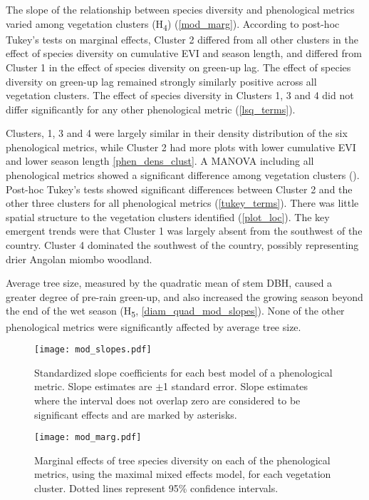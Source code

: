 \documentclass[11pt,a4paper]{article}
\begin{document}
The slope of the relationship between species diversity and phenological metrics varied among vegetation clusters (H\textsubscript{4}) (\autoref{mod_marg}). According to post-hoc Tukey's tests on marginal effects, Cluster 2 differed from all other clusters in the effect of species diversity on cumulative EVI and season length, and differed from Cluster 1 in the effect of species diversity on green-up lag. The effect of species diversity on green-up lag remained strongly similarly positive across all vegetation clusters. The effect of species diversity in Clusters 1, 3 and 4 did not differ significantly for any other phenological metric (\autoref{lsq_terms}).  

Clusters, 1, 3 and 4 were largely similar in their density distribution of the six phenological metrics, while Cluster 2 had more plots with lower cumulative EVI and lower season length \autoref{phen_dens_clust}. A MANOVA including all phenological metrics showed a significant difference among vegetation clusters (\phenManova{}). Post-hoc Tukey's tests showed significant differences between Cluster 2 and the other three clusters for all phenological metrics (\autoref{tukey_terms}). There was little spatial structure to the vegetation clusters identified (\autoref{plot_loc}). The key emergent trends were that Cluster 1 was largely absent from the southwest of the country. Cluster 4 dominated the southwest of the country, possibly representing drier Angolan miombo woodland. 

Average tree size, measured by the quadratic mean of stem DBH, caused a greater degree of pre-rain green-up, and also increased the growing season beyond the end of the wet season (H\textsubscript{5}, \autoref{diam_quad_mod_slopes}). None of the other phenological metrics were significantly affected by average tree size.



 

\begin{figure}[H]
\centering
	\texttt{[image: mod\_slopes.pdf]}
	\caption{Standardized slope coefficients for each best model of a phenological metric. Slope estimates are $\pm$1 standard error. Slope estimates where the interval does not overlap zero are considered to be significant effects and are marked by asterisks.}
	\label{mod_slopes}
\end{figure}

\begin{figure}[H]
\centering
	\texttt{[image: mod\_marg.pdf]}
	\caption{Marginal effects of tree species diversity on each of the phenological metrics, using the maximal mixed effects model, for each vegetation cluster. Dotted lines represent 95\% confidence intervals.}
	\label{mod_marg}
\end{figure}
\end{document}
